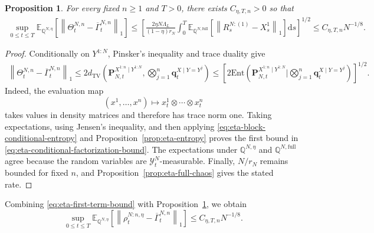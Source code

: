 \documentclass[10pt,a4paper,reqno]{amsart}
\numberwithin{equation}{section}
\theoremstyle{plain}
\newtheorem{proposition}[theorem]{Proposition}
\theoremstyle{definition}
\theoremstyle{remark}
\renewcommand{\d}{\mathrm d}
\newcommand{\Ent}{\mathrm{Ent}}
\newcommand{\E}{\mathbb E}
\newcommand{\Q}{\mathbb Q}
\newcommand{\cY}{\mathcal Y}
\newcommand{\1}{\mathbf 1}
\begin{document}
\begin{proposition}
\label{prop:eta-conditional-factorization}
For every fixed \(n\ge1\) and \(T>0\),  there exists $C_{\eta,T,n}>0$ so that
\begin{equation}
\begin{aligned}
  \sup_{0\le t\le T}
  \E_{\Q^{N,\eta}}
  \left[
    \left\|
      \Theta_t^{N,n}-\overline\Gamma_t^{N,n}
    \right\|_1
  \right]\le
  \left[
    \frac{2\eta N \Lambda_L}{(1-\eta)r_N}
    \int_0^T
    \E_{\Q^{N,\mathrm{full}}}
    \left[
      \left\|
        R_s^{N:(1)}-X_s^1
      \right\|_1
    \right]\d s
  \right]^{1/2}
\le
  C_{\eta,T,n}N^{-1/8}.
\end{aligned}
  \label{eq:eta-conditional-factorization-bound}
\end{equation}
\end{proposition}

\begin{proof}
Conditionally on \(Y^{1:N}\), Pinsker's inequality and trace duality give
\[
\begin{aligned}
  \left\|
    \Theta_t^{N,n}-\overline\Gamma_t^{N,n}
  \right\|_1
  \le
  2d_{\mathrm{TV}}
  \left(
    \mathbf P_{N,t}^{X^{1:n}\mid Y^{1:N}},
    \bigotimes_{j=1}^n
    \mathbf q_t^{X\mid Y=Y^j}
  \right)\le
  \left[
    2
    \Ent\left(
      \mathbf P_{N,t}^{X^{1:n}\mid Y^{1:N}}
      \mathrel{\bigg|}
      \bigotimes_{j=1}^n
      \mathbf q_t^{X\mid Y=Y^j}
    \right)
  \right]^{1/2}.
\end{aligned}
\]
Indeed, the evaluation map
\[
  (x^1,\ldots,x^n)
  \longmapsto
  x_t^1\otimes\cdots\otimes x_t^n
\]
takes values in density matrices and therefore has trace norm one.  Taking 
expectations, using Jensen's inequality, and then applying
\eqref{eq:eta-block-conditional-entropy} and
Proposition~\ref{prop:eta-entropy} proves the first bound in
\eqref{eq:eta-conditional-factorization-bound}.  The expectations under
\(\Q^{N,\eta}\) and \(\Q^{N,\mathrm{full}}\) agree because the random
variables are \(\cY_t^N\)-measurable.  Finally,
\(N/r_N\) remains bounded for fixed \(n\), and
Proposition~\ref{prop:eta-full-chaos} gives the stated rate.
\end{proof}

Combining \eqref{eq:eta-first-term-bound} with
Proposition~\ref{prop:eta-conditional-factorization}, we obtain
\begin{equation}
  \sup_{0\le t\le T}
  \E_{\Q^{N,\eta}}
  \left[
    \left\|
      \rho_t^{N:n,\eta}-\overline\Gamma_t^{N,n}
    \right\|_1
  \right]
  \le
  C_{\eta,T,n}N^{-1/8}.
  \label{eq:eta-intermediate-chaos}
\end{equation}
\end{document}
